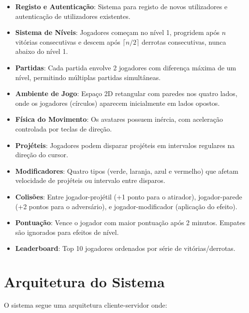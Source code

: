 \documentclass[12pt,a4paper]{report}
\begin{document}
\begin{itemize}
    \item \textbf{Registo e Autenticação}: Sistema para registo de novos utilizadores e autenticação de utilizadores existentes.

    \item \textbf{Sistema de Níveis}: Jogadores começam no nível 1, progridem após $n$ vitórias consecutivas e descem após $\lceil n/2 \rceil$ derrotas consecutivas, nunca abaixo do nível 1.

    \item \textbf{Partidas}: Cada partida envolve 2 jogadores com diferença máxima de um nível, permitindo múltiplas partidas simultâneas.

    \item \textbf{Ambiente de Jogo}: Espaço 2D retangular com paredes nos quatro lados, onde os jogadores (círculos) aparecem inicialmente em lados opostos.

    \item \textbf{Física do Movimento}: Os avatares possuem inércia, com aceleração controlada por teclas de direção.

    \item \textbf{Projéteis}: Jogadores podem disparar projéteis em intervalos regulares na direção do cursor.

    \item \textbf{Modificadores}: Quatro tipos (verde, laranja, azul e vermelho) que afetam velocidade de projéteis ou intervalo entre disparos.

    \item \textbf{Colisões}: Entre jogador-projétil (+1 ponto para o atirador), jogador-parede (+2 pontos para o adversário), e jogador-modificador (aplicação do efeito).

    \item \textbf{Pontuação}: Vence o jogador com maior pontuação após 2 minutos. Empates são ignorados para efeitos de nível.

    \item \textbf{Leaderboard}: Top 10 jogadores ordenados por série de vitórias/derrotas.
\end{itemize}

\section{Arquitetura do Sistema}

O sistema segue uma arquitetura cliente-servidor onde:
\end{document}
